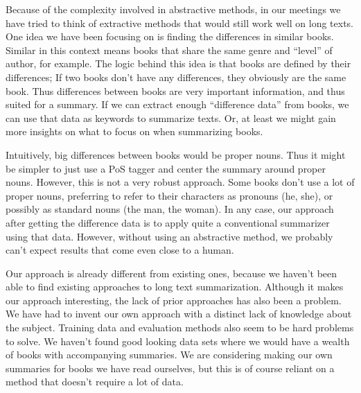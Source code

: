 Because of the complexity involved in abstractive methods, in our meetings we
have tried to think of extractive methods that would still work well on long
texts. One idea we have been focusing on is finding the differences in similar
books. Similar in this context means books that share the same genre and
``level'' of author, for example. The logic behind this idea is that books are
defined by their differences; If two books don't have any differences, they
obviously are the same book. Thus differences between books are very important
information, and thus suited for a summary. If we can extract enough
``difference data'' from books, we can use that data as keywords to summarize
texts. Or, at least we might gain more insights on what to focus on when
summarizing books.

Intuitively, big differences between books would be proper nouns. Thus it might
be simpler to just use a PoS tagger and center the summary around proper nouns.
However, this is not a very robust approach. Some books don't use a lot of
proper nouns, preferring to refer to their characters as pronouns (he, she), or
possibly as standard nouns (the man, the woman).  In any case, our approach
after getting the difference data is to apply quite a conventional summarizer
using that data. However, without using an abstractive method, we probably
can't expect results that come even close to a human.

Our approach is already different from existing ones, because we haven't been
able to find existing approaches to long text summarization.  Although it makes
our approach interesting, the lack of prior approaches has also been a problem.
We have had to invent our own approach with a distinct lack of knowledge about
the subject. Training data and evaluation methods also seem to be hard problems
to solve. We haven't found good looking data sets where we would have a wealth
of books with accompanying summaries. We are considering making our own
summaries for books we have read ourselves, but this is of course reliant on a
method that doesn't require a lot of data.


